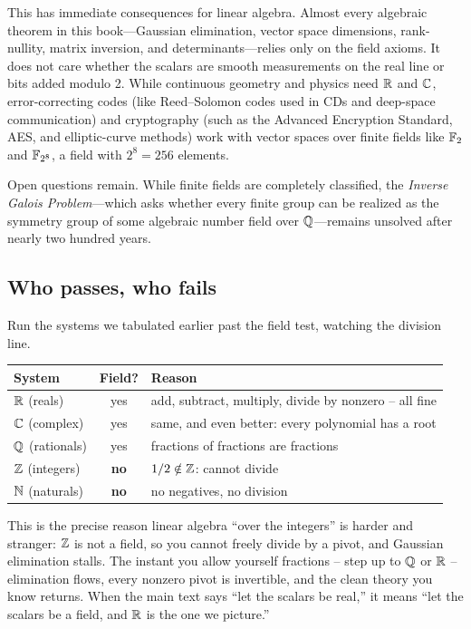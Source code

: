 \begin{historybox}
This has immediate consequences for linear algebra. Almost every algebraic theorem in this
book---Gaussian elimination, vector space dimensions, rank-nullity, matrix inversion, and
determinants---relies only on the field axioms. It does not care whether the scalars are
smooth measurements on the real line or bits added modulo 2. While continuous geometry
and physics need $\mathbb{R}$ and $\mathbb{C}$, error-correcting codes (like
Reed--Solomon codes used in CDs and deep-space communication) and cryptography (such as the
Advanced Encryption Standard, AES, and elliptic-curve methods) work with vector spaces over
finite fields like $\mathbb{F}_2$ and $\mathbb{F}_{2^8}$, a field with $2^8 = 256$ elements.

Open questions remain. While finite fields are completely classified, the
\emph{Inverse Galois Problem}---which asks whether every finite group can be realized as the
symmetry group of some algebraic number field over $\mathbb{Q}$---remains unsolved after nearly two
hundred years.
\end{historybox}

\subsection{Who passes, who fails}

Run the systems we tabulated earlier past the field test, watching the division line.

\begin{center}
\begin{tabular}{lcl}
\toprule
System & Field? & Reason \\
\midrule
$\mathbb{R}$ (reals) & yes & add, subtract, multiply, divide by nonzero -- all fine \\
$\mathbb{C}$ (complex) & yes & same, and even better: every polynomial has a root \\
$\mathbb{Q}$ (rationals) & yes & fractions of fractions are fractions \\
$\mathbb{Z}$ (integers) & \textbf{no} & $1/2 \notin \mathbb{Z}$: cannot divide \\
$\mathbb{N}$ (naturals) & \textbf{no} & no negatives, no division \\
\bottomrule
\end{tabular}
\end{center}

This is the precise reason linear algebra ``over the integers'' is harder and stranger:
$\mathbb{Z}$ is not a field, so you cannot freely divide by a pivot, and Gaussian elimination
stalls. The instant you allow yourself fractions -- step up to $\mathbb{Q}$ or $\mathbb{R}$ -- elimination
flows, every nonzero pivot is invertible, and the clean theory you know returns. When the
main text says ``let the scalars be real,'' it means ``let the scalars be a
field, and $\mathbb{R}$ is the one we picture.''


